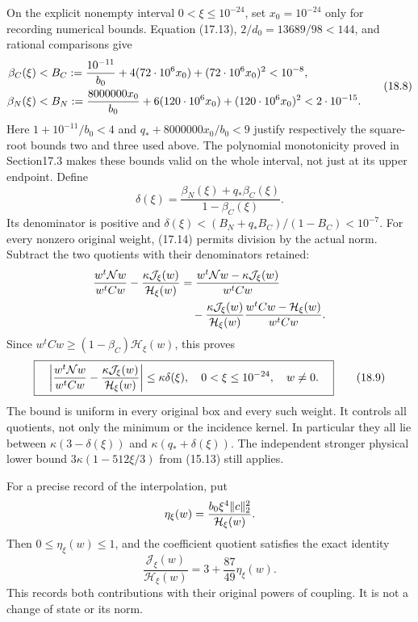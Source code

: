 \documentclass[
]{article}
\begin{document}
On the explicit nonempty interval \(0<\xi\le10^{-24}\), set
\(x_0=10^{-24}\) only for recording numerical bounds. Equation (17.13),
\(2/d_0=13689/98<144\), and rational comparisons give \[
\begin{split}
\beta_C(\xi)&<B_C:={10^{-11}\over b_0}
 +4(72\cdot10^6x_0)+(72\cdot10^6x_0)^2<10^{-8},\\
\beta_N(\xi)&<B_N:={8000000x_0\over b_0}
 +6(120\cdot10^6x_0)+(120\cdot10^6x_0)^2<2\cdot10^{-15}.
\end{split}                                                   \tag{18.8}
\] Here \(1+10^{-11}/b_0<4\) and \(q_*+8000000x_0/b_0<9\) justify
respectively the square-root bounds two and three used above. The
polynomial monotonicity proved in Section17.3 makes these bounds valid
on the whole interval, not just at its upper endpoint. Define \[
\delta(\xi)=\frac{\beta_N(\xi)+q_*\beta_C(\xi)}{1-\beta_C(\xi)}.
\] Its denominator is positive and
\(\delta(\xi)<(B_N+q_*B_C)/(1-B_C)<10^{-7}\). For every nonzero original
weight, (17.14) permits division by the actual norm. Subtract the two
quotients with their denominators retained: \[
\begin{split}
{w^t\mathcal Nw\over w^tCw}
 -{\kappa\mathcal J_\xi(w)\over\mathcal H_\xi(w)}
&={w^t\mathcal Nw-\kappa\mathcal J_\xi(w)\over w^tCw}\\
&\quad-{\kappa\mathcal J_\xi(w)\over\mathcal H_\xi(w)}
 {w^tCw-\mathcal H_\xi(w)\over w^tCw}.
\end{split}
\] Since \(w^tCw\ge(1-\beta_C)\mathcal H_\xi(w)\), this proves \[
\boxed{\quad
\left|{w^t\mathcal Nw\over w^tCw}
       -{\kappa\mathcal J_\xi(w)\over\mathcal H_\xi(w)}\right|
 \le\kappa\delta(\xi),\quad
0<\xi\le10^{-24},\quad w\ne0.\quad}                         \tag{18.9}
\] The bound is uniform in every original box and every such weight. It
controls all quotients, not only the minimum or the incidence kernel. In
particular they all lie between \(\kappa(3-\delta(\xi))\) and
\(\kappa(q_*+\delta(\xi))\). The independent stronger physical lower
bound \(3\kappa(1-512\xi/3)\) from (15.13) still applies.

For a precise record of the interpolation, put \[
\eta_\xi(w)={b_0\xi^4\|c\|_2^2\over\mathcal H_\xi(w)}.
\] Then \(0\le\eta_\xi(w)\le1\), and the coefficient quotient satisfies
the exact identity \[
\frac{\mathcal J_\xi(w)}{\mathcal H_\xi(w)}
 =3+\frac{87}{49}\eta_\xi(w).                                \tag{18.10}
\] This records both contributions with their original powers of
coupling. It is not a change of state or its norm.
\end{document}
